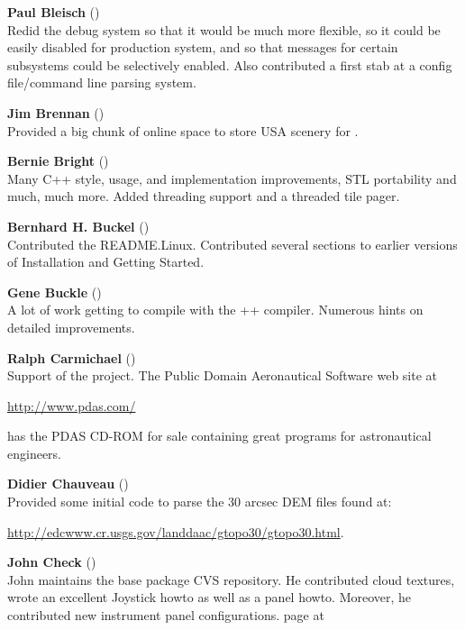 \noindent \textbf{Paul Bleisch} ()\\
  Redid the debug system so that it would be much more
  flexible, so it could be easily disabled for production system, and
  so that messages for certain subsystems could be selectively
  enabled. Also contributed a first stab at a config file/command line parsing
  system.
 \medskip


\noindent \textbf{Jim Brennan} ()\\
  Provided a big chunk of online space to store USA scenery for \FlightGear{}$\!$.
 \medskip

\noindent \textbf{Bernie Bright}
()\\
  Many C++ style, usage, and implementation improvements, STL
  portability and much, much more.
  Added threading support and a threaded tile pager.
 \medskip

\noindent \textbf{Bernhard H. Buckel}
()\\
  Contributed the README.Linux.  Contributed several sections to earlier versions of
 Installation and Getting Started.
 \medskip

\noindent \textbf{Gene Buckle} ()\\
  A lot of work getting \FlightGear{} to compile with the ++
  compiler. Numerous hints on detailed improvements.
 \medskip


\noindent \textbf{Ralph Carmichael} ()\\
  Support of the project. The Public Domain Aeronautical Software web site at
\medskip

\href{http://www.pdas.com/}{http://www.pdas.com/}
 \medskip

 \noindent
 has the PDAS CD-ROM for sale containing great programs for astronautical engineers.

\noindent \textbf{Didier Chauveau}
()\\
  Provided some initial code to parse the 30 arcsec DEM files found at:
   \medskip

  \href{http://edcwww.cr.usgs.gov/landdaac/gtopo30/gtopo30.html}{http://edcwww.cr.usgs.gov/landdaac/gtopo30/gtopo30.html}.
 \medskip

\noindent \textbf{John Check} ()\\
 John maintains the base package CVS repository. He contributed cloud textures, wrote an excellent Joystick howto as well as a panel
 howto. Moreover, he contributed new instrument panel configurations. \FlightGear{}
 page at
 \medskip

